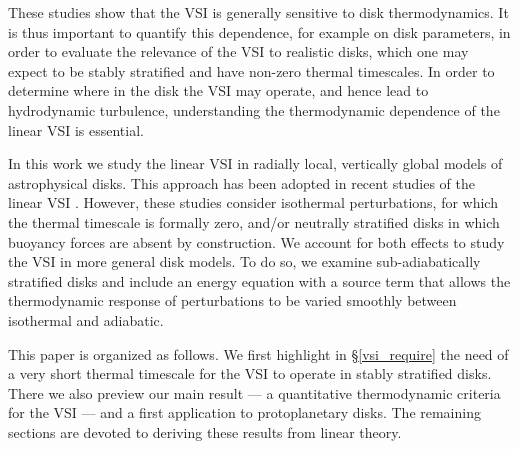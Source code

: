 \documentclass[iop]{emulateapj}
\begin{document}
These studies show that the VSI is generally sensitive to disk
thermodynamics. It is thus important to quantify this dependence, for
example on disk parameters, in order to evaluate the relevance of the
VSI to realistic disks, which one may expect to be stably
stratified and have non-zero thermal timescales.  In order to determine
where in the disk the VSI may operate, and hence lead to hydrodynamic
turbulence, understanding the thermodynamic dependence of the linear VSI is essential. 


In this work we study the linear VSI in radially local, vertically
global models of astrophysical disks. This approach has
been adopted in recent studies of the linear VSI
\citep{nelson13,mcnally14,barker15}. However, these studies consider 
isothermal perturbations, for which the thermal timescale is formally
zero, and/or neutrally stratified disks in which buoyancy forces are
absent by construction. We account for both effects to study the
VSI in more general disk models. To do so, we examine 
sub-adiabatically stratified disks and include an energy equation 
with a source term that allows the thermodynamic response of 
perturbations to be varied smoothly between isothermal and 
adiabatic.   






This paper is organized as follows. We first highlight in
\S\ref{vsi_require} the need of a very short thermal timescale for the
VSI to operate in stably stratified disks. There we also preview our
main result --- a quantitative thermodynamic criteria for the VSI ---
and a first application to protoplanetary disks. The remaining sections
are devoted to deriving these results from linear theory. 
\end{document}
